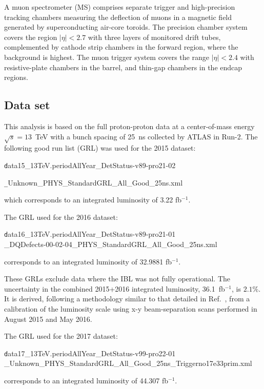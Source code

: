A muon spectrometer (MS) comprises separate trigger and high-precision tracking chambers measuring the deflection of muons in a magnetic field generated by superconducting air-core toroids. The precision chamber system covers the region $| \eta |< 2.7$ with three layers of monitored drift tubes, complemented by cathode strip chambers in the forward region, where the background is highest. The muon trigger system covers the range $| \eta | < 2.4$ with resistive-plate chambers in the barrel, and thin-gap chambers in the endcap regions.

\subsection{Data set}
\label{sec:dataset}

This analysis is based on the full proton-proton data at a center-of-mass energy $\sqrt{s}=13$~TeV with a bunch spacing of 25~ns collected by ATLAS in Run-2. The following good run list (GRL) was used for the 2015 dataset:

\begin{centering}
{\texttt data15\_13TeV.periodAllYear\_DetStatus-v89-pro21-02}

{\texttt \_Unknown\_PHYS\_StandardGRL\_All\_Good\_25ns.xml}

\end{centering}
which corresponds to an integrated luminosity of 3.22 fb$^{-1}$.

The GRL used for the 2016 dataset:

\begin{centering}
{\texttt data16\_13TeV.periodAllYear\_DetStatus-v89-pro21-01\\\_DQDefects-00-02-04\_PHYS\_StandardGRL\_All\_Good\_25ns.xml}

\end{centering}
corresponds to an integrated luminosity of 32.9881 fb$^{-1}$.

These GRLs exclude data where the IBL was not fully operational. The uncertainty in the combined 2015+2016 integrated luminosity, 36.1~fb$^{-1}$, is $2.1\%$. It is derived, following a methodology similar to that detailed in Ref.~\cite{DAPR-2013-01}, from a calibration of the luminosity scale using x-y beam-separation scans performed in August 2015 and May 2016.

The GRL used for the 2017 dataset:

\begin{centering}
{\texttt data17\_13TeV.periodAllYear\_DetStatus-v99-pro22-01\\\_Unknown\_PHYS\_StandardGRL\_All\_Good\_25ns\_Triggerno17e33prim.xml}

\end{centering}
corresponds to an integrated luminosity of 44.307 fb$^{-1}$.

